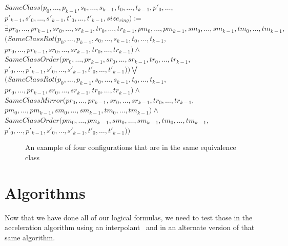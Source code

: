 \documentclass{article}
\begin{document}
\begin{center}
    
    $SameClass(p_{0}, \dots, p_{k-1}, s_{0}, \dots, s_{k-1}, t_{0}, \dots, t_{k-1}, p'_{0}, \dots,$\\
    $p'_{k-1}, s'_{0}, \dots, s'_{k-1}, t'_{0}, \dots, t'_{k-1}, size_{ring}):=$\\
    $\exists pr_{0}, \dots, pr_{k-1}, sr_{0}, \dots, sr_{k-1}, tr_{0}, \dots, tr_{k-1}, pm_{0}, \dots, pm_{k-1}, sm_{0}, \dots, sm_{k-1}, tm_{0}, \dots, tm_{k-1},$\\
    $(SameClassRot(p_{0}, \dots, p_{k-1}, s_{0}, \dots, s_{k-1}, t_{0}, \dots, t_{k-1},$\\
    $pr_{0}, \dots, pr_{k-1}, sr_{0}, \dots, sr_{k-1}, tr_{0}, \dots, tr_{k-1}) \land$\\
    $SameClassOrder(pr_{0}, \dots, pr_{k-1}, sr_{0}, \dots, sr_{k-1}, tr_{0}, \dots, tr_{k-1},$\\$
    p'_{0}, \dots, p'_{k-1}, s'_{0}, \dots, s'_{k-1}, t'_{0}, \dots, t'_{k-1}))\bigvee$\\
    $(SameClassRot(p_{0}, \dots, p_{k-1}, s_{0}, \dots, s_{k-1}, t_{0}, \dots, t_{k-1},$\\
    $pr_{0}, \dots, pr_{k-1}, sr_{0}, \dots, sr_{k-1}, tr_{0}, \dots, tr_{k-1}) \land$\\
    $SameClassMirror(pr_{0}, \dots, pr_{k-1}, sr_{0}, \dots, sr_{k-1}, tr_{0}, \dots, tr_{k-1},$\\
    $pm_{0}, \dots, pm_{k-1}, sm_{0}, \dots, sm_{k-1}, tm_{0}, \dots, tm_{k-1})\land$\\
    $SameClassOrder(pm_{0}, \dots, pm_{k-1}, sm_{0}, \dots, sm_{k-1}, tm_{0}, \dots, tm_{k-1},$\\
    $p'_{0}, \dots,p'_{k-1}, s'_{0}, \dots, s'_{k-1}, t'_{0}, \dots, t'_{k-1}) )$
\end{center}

\begin{figure}[!hp]
    \centering
    \def\svgscale{0.8}
    
    \caption{An example of four configurations that are in the same equivalence class}
    \label{dessinEqui}
\end{figure}

\newpage

\section{Algorithms}

Now that we have done all of our logical formulas, we need to test those in the acceleration algorithm using an interpolant~\cite{algo} and in an alternate version of that same algorithm.
\end{document}
